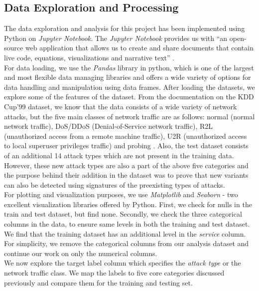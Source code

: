 \subsection{Data Exploration and Processing}
The data exploration and analysis for this project has been implemented using Python on {\em Jupyter Notebook}. The {\em Jupyter Notebook} provides us with ``an open-source web application that allows us to create and share documents that contain live code, equations, visualizations and narrative text'' \cite{jup08}.\\
For data loading, we use the {\em Pandas} library in python, which is one of the largest and most flexible data managing libraries and offers a wide variety of options for data handling and manipulation using data frames. After loading the datasets, we explore some of the features of the dataset. From the documentation on the KDD Cup'99 dataset, we know that the data consists of a wide variety of network attacks, but the five main classes of network traffic are as follows: normal (normal network traffic), DoS/DDoS (Denial-of-Service network traffic), R2L (unauthorized access from a remote machine traffic), U2R (unauthorized access to local superuser privileges traffic) and probing \cite{kdd06}. Also, the test dataset consists of an additional 14 attack types which are not present in the training data. However, these new attack types are also a part of the above five categories and the purpose behind their addition in the dataset was to prove that new variants can also be detected using signatures of the preexisting types of attacks.\\
For plotting and visualization purposes, we use {\em Matplotlib} and {\em Seaborn} - two excellent visualization libraries offered by Python. First, we check for nulls in the train and test dataset, but find none. Secondly, we check the three categorical columns in the data, to ensure same levels in both the training and test dataset. We find that the training dataset has an additional level in the {\em service} column. For simplicity, we remove the categorical columns from our analysis dataset and continue our work on only the numerical columns.\\
We now explore the target label column which specifies the {\em attack type} or the network traffic class. We map the labels to five core categories discussed previously and compare them for the training and testing set.
